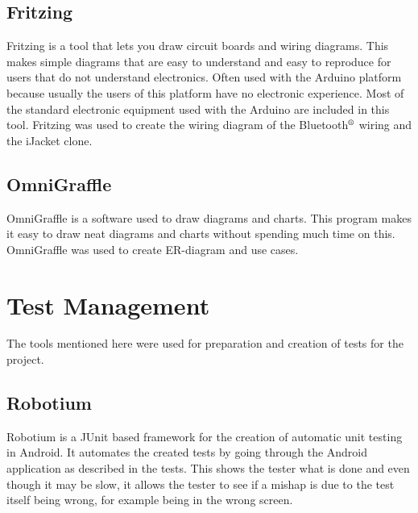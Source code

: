 \subsection{Fritzing}
Fritzing is a tool that lets you draw circuit boards and wiring diagrams. This makes simple diagrams that are easy to understand and easy to reproduce for users that do not understand electronics. Often used with the Arduino platform because usually the users of this platform have no electronic experience. Most of the standard electronic equipment used with the Arduino are included in this tool. Fritzing was used to create the wiring diagram of the Bluetooth$\textsuperscript{\textregistered}$ wiring and the iJacket clone.

\subsection{OmniGraffle}
OmniGraffle is a software used to draw diagrams and charts. This program makes it easy to draw neat diagrams and charts without spending much time on this. OmniGraffle was used to create ER-diagram and use cases.

\section{Test Management}
The tools mentioned here were used for preparation and creation of tests for the project.

\subsection{Robotium}
Robotium is a JUnit based framework for the creation of automatic unit testing in Android. It automates the created tests by going through the Android application as described in the tests. This shows the tester what is done and even though it may be slow, it allows the tester to see if a mishap is due to the test itself being wrong, for example being in the wrong screen.
